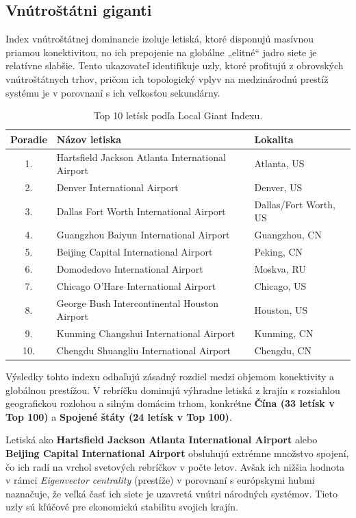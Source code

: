 \subsection{Vnútroštátni giganti}

Index vnútroštátnej dominancie izoluje letiská, ktoré disponujú masívnou priamou konektivitou, no ich prepojenie na globálne „elitné“ 
jadro siete je relatívne slabšie. Tento ukazovateľ identifikuje uzly, ktoré profitujú z obrovských vnútroštátnych trhov, pričom ich topologický vplyv
 na medzinárodnú prestíž systému je v porovnaní s ich veľkosťou sekundárny.

\begin{table}[h!]
\centering
\small
\begin{tabular}{cll}
\hline
\textbf{Poradie} & \textbf{Názov letiska} & \textbf{Lokalita} \\ \hline
1. & Hartsfield Jackson Atlanta International Airport & Atlanta, US \\
2. & Denver International Airport & Denver, US \\
3. & Dallas Fort Worth International Airport & Dallas/Fort Worth, US \\
4. & Guangzhou Baiyun International Airport & Guangzhou, CN \\
5. & Beijing Capital International Airport & Peking, CN \\
6. & Domodedovo International Airport & Moskva, RU \\
7. & Chicago O'Hare International Airport & Chicago, US \\
8. & George Bush Intercontinental Houston Airport & Houston, US \\
9. & Kunming Changshui International Airport & Kunming, CN \\
10. & Chengdu Shuangliu International Airport & Chengdu, CN \\ \hline
\end{tabular}
\caption{\centering Top 10 letísk podľa Local Giant Indexu.}
\label{tab:local_giant_index}
\end{table}

Výsledky tohto indexu odhaľujú zásadný rozdiel medzi objemom konektivity a globálnou prestížou. V rebríčku dominujú výhradne letiská z krajín 
s rozsiahlou geografickou rozlohou a silným domácim trhom, konkrétne \textbf{Čína (33 letísk v Top 100)} a \textbf{Spojené štáty (24 letísk v Top 100)}. 

Letiská ako \textbf{Hartsfield Jackson Atlanta International Airport} alebo \textbf{Beijing Capital International Airport} obsluhujú extrémne 
množstvo spojení, čo ich radí na vrchol svetových rebríčkov v počte letov. Avšak ich nižšia hodnota v rámci \textit{Eigenvector centrality} 
(prestíže) v porovnaní s európskymi hubmi naznačuje, že veľká časť ich siete je uzavretá vnútri národných systémov. Tieto uzly sú kľúčové pre 
ekonomickú stabilitu svojich krajín.


